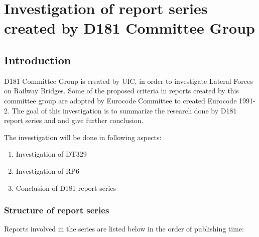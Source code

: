 

\chapter{Investigation of report series created by D181 Committee Group}


\section{Introduction}

D181 Committee Group is created by UIC, in order to investigate Lateral Forces on Railway Bridges. Some of the proposed criteria in reports created by this committee group are adopted by Eurocode Committee to created Eurocode 1991-2. The goal of this investigation is to summarize the research done by D181 report series and and give further conclusion.

The investigation will be done in following aspects:

\begin{enumerate}
    \item Investigation of DT329
    \item Investigation of RP6
    \item Conclusion of D181 report series
\end{enumerate}

\subsection{Structure of report series}

Reports involved in the series are listed below in the order of publishing time:

